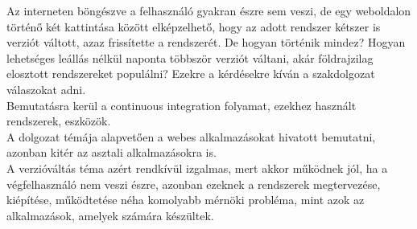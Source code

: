 Az interneten böngészve a felhasználó gyakran észre sem veszi, de egy weboldalon történő két kattintása között elképzelhető, hogy az adott rendszer kétszer is verziót váltott, azaz frissítette a rendszerét. De hogyan történik mindez? Hogyan lehetséges leállás nélkül naponta többször verziót váltani, akár földrajzilag elosztott rendszereket populálni? Ezekre a kérdésekre kíván a szakdolgozat válaszokat adni.
\\
Bemutatásra kerül a continuous integration folyamat, ezekhez használt rendszerek, eszközök.
\\
A dolgozat témája alapvetően a webes alkalmazásokat hivatott bemutatni, azonban kitér az asztali alkalmazásokra is.
\\
A verzióváltás téma azért rendkívül izgalmas, mert akkor működnek jól, ha a végfelhasználó nem veszi észre, azonban ezeknek a rendszerek megtervezése, kiépítése, működtetése néha komolyabb mérnöki probléma, mint azok az alkalmazások, amelyek számára készültek.
